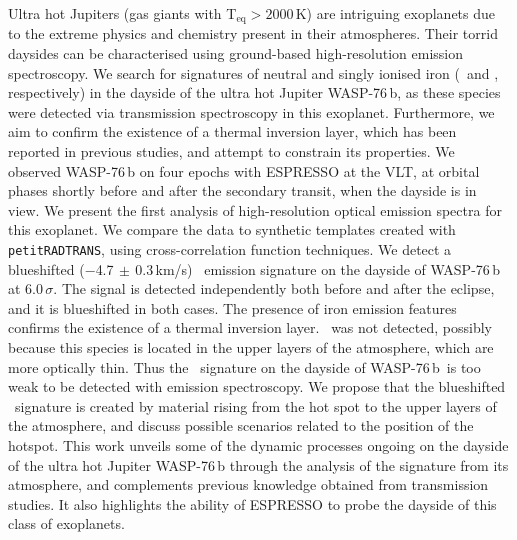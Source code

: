 \documentclass{aa}
\newcommand{\feI}{\ion{Fe}{i}}
\newcommand{\feII}{\ion{Fe}{ii}}
\newcommand{\planet}{WASP-76\,b}
\begin{document}

   \date{Received 11 March 2024; accepted 9 July 2024}

 
  \abstract
   {Ultra hot Jupiters (gas giants with T$_\mathrm{eq}>2000$\,K) are intriguing exoplanets due to the extreme physics and chemistry present in their atmospheres. Their torrid daysides can be characterised using ground-based high-resolution emission spectroscopy.}
   {We search for signatures of neutral and singly ionised iron (\feI\ and \feII, respectively) in the dayside of the ultra hot Jupiter WASP-76\,b, as these species were detected via transmission spectroscopy in this exoplanet. Furthermore, we aim to confirm the existence of a thermal inversion layer, which has been reported in previous studies, and attempt to constrain its properties.}
   {We observed WASP-76\,b on four epochs with ESPRESSO at the VLT, at orbital phases shortly before and after the secondary transit, when the dayside is in view. We present the first analysis of high-resolution optical emission spectra for this exoplanet. We compare the data to synthetic templates created with \texttt{petitRADTRANS}, using cross-correlation function techniques.}
   {We detect a blueshifted ($-$4.7$\,\pm\,$0.3\,km/s) \feI\ emission signature on the dayside of WASP-76\,b at 6.0\,$\sigma$. The signal is detected independently both before and after the eclipse, and it is blueshifted in both cases. The presence of iron emission features confirms the existence of a thermal inversion layer. \feII\ was not detected, possibly because this species is located in the upper layers of the atmosphere, which are more optically thin. Thus the \feII\ signature on the dayside of \planet\ is too weak to be detected with emission spectroscopy.}
   {We propose that the blueshifted \feI\ signature is created by material rising from the hot spot to the upper layers of the atmosphere, and discuss possible scenarios related to the position of the hotspot. This work unveils some of the dynamic processes ongoing on the dayside of the ultra hot Jupiter WASP-76\,b through the analysis of the  signature from its atmosphere, and complements previous knowledge obtained from transmission studies. It also highlights the ability of ESPRESSO to probe the dayside of this class of exoplanets.}
\end{document}
